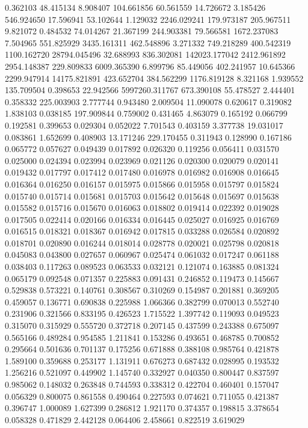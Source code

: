 0.362103
48.415134
8.908407
104.661856
60.561559
14.726672
3.185426
546.924650
17.596941
53.102644
1.129032
2246.029241
179.973187
205.967511
9.821072
0.484532
74.014267
21.367199
244.903381
79.566581
1672.237083
7.504965
551.825929
3435.161311
462.548896
3.271332
749.218289
400.542319
1100.162720
28794.045496
32.688993
836.302081
142023.177042
2412.961892
2954.148387
229.809833
6009.365390
6.899796
85.449056
402.241957
10.645366
2299.947914
14175.821891
423.652704
384.562299
1176.819128
8.321168
1.939552
135.709504
0.398653
22.942566
5997260.311767
673.390108
55.478527
2.444401
0.358332
225.003903
2.777744
0.943480
2.009504
11.090078
0.620617
0.319082
1.838103
0.038185
197.909844
0.759002
0.431465
4.863079
0.165192
0.066799
0.192581
0.399653
0.029304
0.052022
7.701543
0.403159
3.377738
19.031017
0.083861
1.652699
0.408903
13.171246
229.170455
0.311943
0.128990
0.167186
0.065772
0.057627
0.049439
0.017892
0.026320
0.119256
0.056411
0.031570
0.025000
0.024394
0.023994
0.023969
0.021126
0.020300
0.020079
0.020141
0.019432
0.017797
0.017412
0.017480
0.016978
0.016982
0.016908
0.016645
0.016364
0.016250
0.016157
0.015975
0.015866
0.015958
0.015797
0.015824
0.015740
0.015714
0.015681
0.015703
0.015642
0.015648
0.015697
0.015638
0.015582
0.015716
0.015670
0.016063
0.018802
0.019414
0.022392
0.019028
0.017505
0.022414
0.020166
0.016334
0.016445
0.025027
0.016925
0.016769
0.016515
0.018321
0.018367
0.016942
0.017815
0.033288
0.026584
0.020892
0.018701
0.020890
0.016244
0.018014
0.028778
0.020021
0.025798
0.020818
0.045083
0.043800
0.027657
0.060967
0.025474
0.061032
0.017247
0.061188
0.038403
0.117263
0.089523
0.063533
0.032121
0.121074
0.163885
0.081324
0.065179
0.092548
0.071357
0.225883
0.091431
0.246852
0.119473
0.145667
0.529838
0.573221
0.140761
0.308567
0.310269
0.154987
0.201881
0.369205
0.459057
0.136771
0.690838
0.225988
1.066366
0.382799
0.070013
0.552740
0.231906
0.321566
0.833195
0.426523
1.715522
1.397742
0.119093
0.049523
0.315070
0.315929
0.555720
0.372718
0.207145
0.437599
0.243388
0.675097
0.565166
0.489284
0.954585
1.211841
0.153286
0.493651
0.468785
0.700852
0.295664
0.501636
0.701137
0.175256
0.671888
0.388108
0.985764
0.421878
1.589100
0.359688
0.253177
1.131911
0.676273
0.687432
0.028995
0.193532
1.256216
0.521097
0.449902
1.145740
0.332927
0.040350
0.800447
0.837597
0.985062
0.148032
0.263848
0.744593
0.338312
0.422704
0.460401
0.157047
0.056329
0.800075
0.861558
0.490464
0.227593
0.074621
0.711055
0.421387
0.396747
1.000089
1.627399
0.286812
1.921170
0.374357
0.198815
3.378654
0.058328
0.471829
2.442128
0.064406
2.458661
0.822519
3.619029
